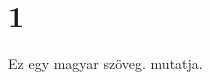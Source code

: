 \documentclass{article}
\begin{document}
\section{1}
\label{elsosor}Ez egy magyar szöveg.
 mutatja.
\end{document}
